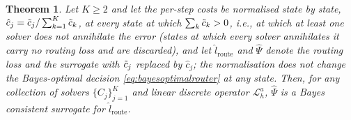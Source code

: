 \documentclass{article}
\newcommand{\edit}[1]{{\color{red}#1}}
\newtheorem{theorem}{Theorem}[section]
\begin{document}
\begin{theorem} \label{th:consistency}
    \edit{Let $K \ge 2$ and let the per-step costs be normalised state by state, $\hat c_j = \Tilde{c}_j / \sum_{k=1}^K \Tilde{c}_k$, at every state at which $\sum_k \Tilde{c}_k > 0$, i.e., at which at least one solver does not annihilate the error (states at which every solver annihilates it carry no routing loss and are discarded), and let $\hat l_{\text{route}}$ and $\hat\Psi$ denote the routing loss and the surrogate with $\Tilde{c}_j$ replaced by $\hat c_j$; the normalisation does not change the Bayes-optimal decision \eqref{eq:bayesoptimalrouter} at any state. Then, for any collection of solvers $\{C_j\}_{j= 1}^K$ and linear discrete operator $\mathcal{L}_h^a$, $\hat\Psi$ is a Bayes consistent surrogate for $\hat l_{\text{route}}$.}
\end{theorem}
\end{document}
